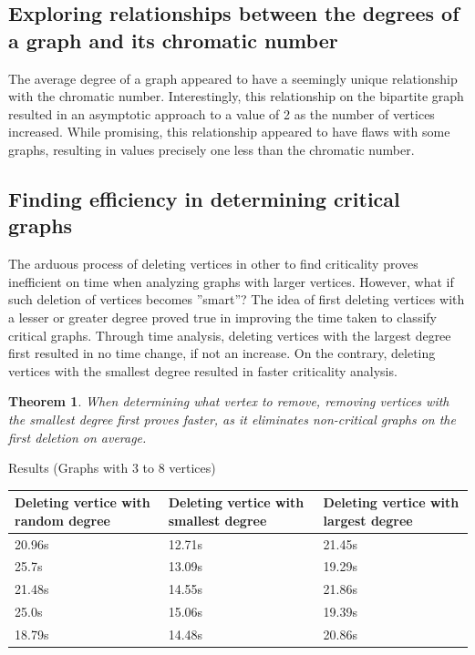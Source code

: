 \documentclass[12pt, letterpaper, twoside]{article}
\newtheorem{theorem}{Theorem}
\begin{document}
\subsection{Exploring relationships between the degrees of a graph and its chromatic number}
The average degree of a graph appeared to have a seemingly unique relationship with the chromatic number. 
Interestingly, this relationship on the bipartite graph resulted in an asymptotic approach to a value of 2 as the number of vertices increased. 
While promising, this relationship appeared to have flaws with some graphs, resulting in values precisely one less than the chromatic number.  

\subsection{Finding efficiency in determining critical graphs}
The arduous process of deleting vertices in other to find criticality proves inefficient on time when analyzing graphs with larger vertices. 
However, what if such deletion of vertices becomes ''smart''?
The idea of first deleting vertices with a lesser or greater degree proved true in improving the time taken to classify critical graphs.
Through time analysis, deleting vertices with the largest degree first resulted in no time change, if not an increase. On the contrary, deleting vertices with the smallest degree resulted in faster criticality analysis.

\begin{theorem}
When determining what vertex to remove, removing vertices with the smallest degree first proves faster, as it eliminates non-critical graphs on the first deletion on average. 
\end{theorem}

Results (Graphs with 3 to 8 vertices)

\begin{tabularx}{0.9\textwidth} { 
  | >{\raggedright\arraybackslash}X 
  | >{\centering\arraybackslash}X 
  | >{\raggedleft\arraybackslash}X | }
  
\toprule
Deleting vertice with random degree & Deleting vertice with smallest degree & Deleting vertice with largest degree \\
\midrule

 20.96s & 12.71s & 21.45s \\
 \hline
 25.7s  & 13.09s  & 19.29s  \\
 \hline
 21.48s  & 14.55s  & 21.86s  \\
 \hline
 25.0s  & 15.06s  & 19.39s  \\
 \hline
 18.79s  & 14.48s  & 20.86s  \\

\hline
\end{tabularx}
\end{document}
